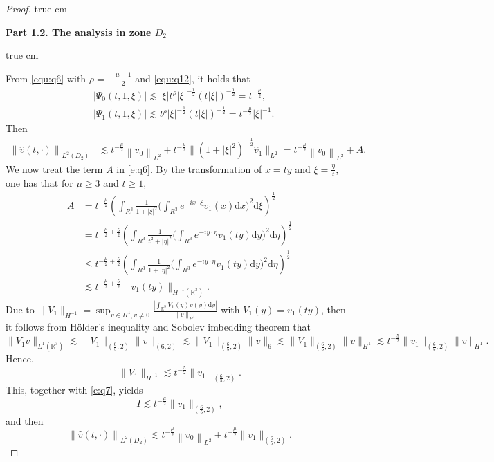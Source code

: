 \documentclass[11pt,twoside]{article}
\newcommand{\R}{\mathbb R}
\newcommand{\f}{\frac}
\theoremstyle{plain}
\theoremstyle{definition}
\theoremstyle{remark}
\numberwithin{equation}{section}
\begin{document}
\begin{proof}
 true cm

{\bf Part 1.2.  The analysis  in zone $D_2$}

 true cm


From \eqref{equ:q6} with $\rho=-\f{\mu-1}{2}$ and \eqref{equ:q12}, it holds that
\begin{equation}\label{e:q5}
\begin{aligned}
& \left|\Psi_0(t, 1,\xi)\right| \lesssim|\xi| t^\rho|\xi|^{-\frac{1}{2}}(t|\xi|)^{-\frac{1}{2}}=t^{-\frac{\mu}{2}}, \\
& \left|\Psi_1(t, 1, \xi)\right|  \lesssim t^\rho|\xi|^{-\frac{1}{2}}(t|\xi|)^{-\frac{1}{2}}=t^{-\frac{\mu}{2}}|\xi|^{-1}.
\end{aligned}
\end{equation}
Then
\begin{equation}\label{e:q6}
\begin{aligned}
\left\|\hat{v}(t, \cdot)\right\|_{L^2(D_2)}
& \lesssim t^{-\frac{\mu}{2}}\left\|v_{0}\right\|_{L^{2}}+t^{-\f{\mu}{2}} \|(1+|\xi|^2)^{-\f{1}{2}}\hat{v}_{1}\|_{L^{2}}
= t^{-\frac{\mu}{2}}\left\|v_{0}\right\|_{L^{2}}+ A.
\end{aligned}
\end{equation}
We now treat the term $A$ in \eqref{e:q6}. By the transformation of $x=ty$ and $\xi=\f{\eta}{t}$, one has that for $\mu\geq 3$ and $t\geq1$,
\begin{equation}\label{e:q7}
\begin{aligned}
A & =t^{-\f{\mu}{2}} \left(\int_{R^3} \frac{1}{1+|\xi|^2}\big(\int_{R^3} e^{-i x \cdot \xi} v_1(x) \mathrm{d} x\big)^2 \mathrm{d}\xi\right)^{\frac{1}{2}}\\
& =t^{-\f{\mu}{2}+\f52}\left(\int_{R^3} \frac{1}{t^2+|\eta|^2}\big(\int_{R^3} e^{-i y \cdot \eta} v_1(ty) \mathrm{d} y\big)^2 \mathrm{d} \eta\right)^{\frac{1}{2}}\\
& \leq t^{-\f{\mu}{2}+\f52}\left(\int_{R^3} \frac{1}{1+|\eta|^2}\big(\int_{R^3} e^{-i y \cdot \eta} v_1(ty) \mathrm{d} y\big)^2 \mathrm{d} \eta\right)^{\frac{1}{2}}\\
& \lesssim t^{-\f{\mu}{2}+\f52}\|v_1(ty)\|_{H^{-1}(\R^3)}.
\end{aligned}
\end{equation}
Due to $\|V_1\|_{H^{-1}}=\sup _{v \in H^1, v \neq 0} \frac{\left|\int_{\mathbb{R}^3} V_1(y) v(y) \mathrm{d} y\right|}{\|v\|_{H^1}}$
with $V_1(y)=v_1(ty)$, then it follows from H\"{o}lder's inequality and Sobolev imbedding theorem that
\begin{equation}\label{e:q8}
\|V_1 v\|_{L^1(\R^3)} \lesssim\|V_1\|_{(\f65, 2)}\|v\|_{\left(6, 2\right)} \lesssim\|V_1\|_{(\f65, 2)}\|v\|_{6} \lesssim\|V_1\|_{(\f65, 2)}\|v\|_{H^1}\lesssim t^{-\f{5}{2}}\|v_1\|_{(\f65, 2)}\|v\|_{H^1}.
\end{equation}
Hence,
$$
\|V_1\|_{H^{-1}}\lesssim t^{-\f{5}{2}}\|v_1\|_{(\f65, 2)}.
$$
This, together with \eqref{e:q7}, yields
$$
I\lesssim t^{-\f{\mu}{2}}\|v_1\|_{(\f65, 2)},
$$
and then
\begin{equation}\label{e:q9}
\left\|\hat{v}(t, \cdot)\right\|_{L^2(D_2)}\lesssim t^{-\frac{\mu}{2}}\left\|v_{0}\right\|_{L^{2}}+ t^{-\f{\mu}{2}}\|v_1\|_{(\f65, 2)}.
\end{equation}


\end{proof}
\end{document}
